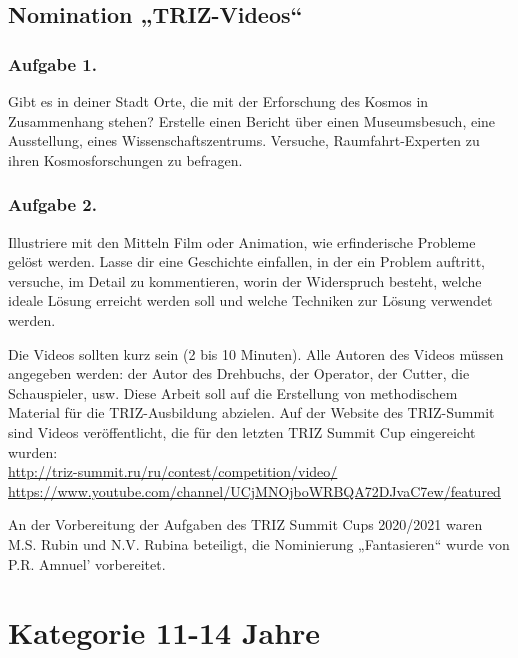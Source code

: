 \documentclass[11pt,a4paper]{article}
\begin{document}
\AnimalsInCosmos

\subsection{Nomination „TRIZ-Videos“}

\newcommand{\VideoOne}{Gibt es in deiner Stadt Orte, die mit der Erforschung
  des Kosmos in Zusammenhang stehen?  Erstelle einen Bericht über einen
  Museumsbesuch, eine Ausstellung, eines Wissenschaftszentrums. Versuche,
  Raumfahrt-Experten zu ihren Kosmosforschungen zu befragen. }

\newcommand{\VideoTwo}{Illustriere mit den Mitteln Film oder Animation, wie
  erfinderische Probleme gelöst werden. Lasse dir eine Geschichte einfallen,
  in der ein Problem auftritt, versuche, im Detail zu kommentieren, worin der
  Widerspruch besteht, welche ideale Lösung erreicht werden soll und welche
  Techniken zur Lösung verwendet werden.}

\newcommand{\GeneralText}{Die Videos sollten kurz sein (2 bis 10 Minuten).
  Alle Autoren des Videos müssen angegeben werden: der Autor des Drehbuchs,
  der Operator, der Cutter, die Schauspieler, usw.  Diese Arbeit soll auf die
  Erstellung von methodischem Material für die TRIZ-Ausbildung abzielen. Auf
  der Website des TRIZ-Summit sind Videos veröffentlicht, die für den letzten
  TRIZ Summit Cup eingereicht wurden: \\
  \url{http://triz-summit.ru/ru/contest/competition/video/}\\
  \url{https://www.youtube.com/channel/UCjMNOjboWRBQA72DJvaC7ew/featured}

  An der Vorbereitung der Aufgaben des TRIZ Summit Cups 2020/2021 waren
  M.S. Rubin und N.V. Rubina beteiligt, die Nominierung „Fantasieren“ wurde
  von P.R. Amnuel' vorbereitet.}

\subsubsection*{Aufgabe 1.}\VideoOne
\subsubsection*{Aufgabe 2.}\VideoTwo

\GeneralText
\clearpage

\section{Kategorie 11-14 Jahre}
\end{document}
